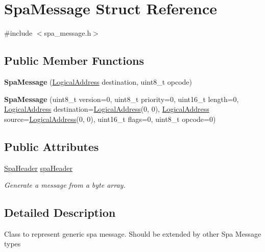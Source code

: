 \hypertarget{structSpaMessage}{}\section{Spa\+Message Struct Reference}
\label{structSpaMessage}


{\ttfamily \#include $<$spa\+\_\+message.\+h$>$}

\subsection*{Public Member Functions}
\begin{DoxyCompactItemize}
\item 
\mbox{\label{structSpaMessage_ac3106c80ebd5c60d0e939c76f77ef0cd}} 
{\bfseries Spa\+Message} (\hyperlink{structLogicalAddress}{Logical\+Address} destination, uint8\+\_\+t opcode)
\item 
\mbox{\label{structSpaMessage_ade633a9b5780d7d361493d30aaa227ff}} 
{\bfseries Spa\+Message} (uint8\+\_\+t version=0, uint8\+\_\+t priority=0, uint16\+\_\+t length=0, \hyperlink{structLogicalAddress}{Logical\+Address} destination=\hyperlink{structLogicalAddress}{Logical\+Address}(0, 0), \hyperlink{structLogicalAddress}{Logical\+Address} source=\hyperlink{structLogicalAddress}{Logical\+Address}(0, 0), uint16\+\_\+t flags=0, uint8\+\_\+t opcode=0)
\end{DoxyCompactItemize}
\subsection*{Public Attributes}
\begin{DoxyCompactItemize}
\item 
\hyperlink{structSpaHeader}{Spa\+Header} \hyperlink{structSpaMessage_af7925bcb1a497c244202963fc5a9c8d6}{spa\+Header}
\begin{DoxyCompactList}\small\item\em Generate a message from a byte array. \end{DoxyCompactList}\end{DoxyCompactItemize}


\subsection{Detailed Description}
Class to represent generic spa message. Should be extended by other Spa Message types 

